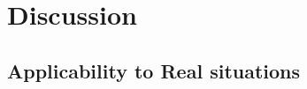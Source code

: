 \begin{figure}
\end{figure}





\section{Discussion}


\subsection{Applicability to Real situations}


